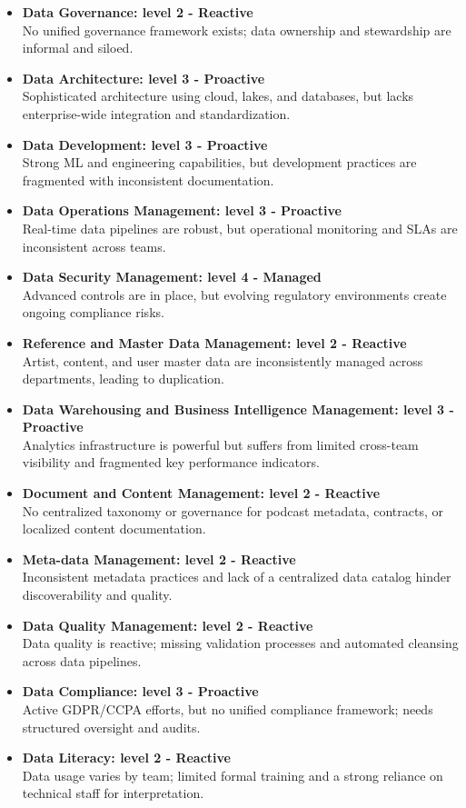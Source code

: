\documentclass[11pt,a4paper,computermodern]{article}
\begin{document}
\begin{itemize}
	\item \textbf{Data Governance: level 2 - Reactive}\\
	No unified governance framework exists; data ownership and stewardship are informal and siloed.
	\item \textbf{Data Architecture: level 3 - Proactive}\\
	Sophisticated architecture using cloud, lakes, and databases, but lacks enterprise-wide integration and standardization.
	\item \textbf{Data Development: level 3 - Proactive}\\
	Strong ML and engineering capabilities, but development practices are fragmented with inconsistent documentation.
	\item \textbf{Data Operations Management: level 3 - Proactive}\\
	Real-time data pipelines are robust, but operational monitoring and SLAs are inconsistent across teams.
	\item \textbf{Data Security Management: level 4 - Managed}\\
	Advanced controls are in place, but evolving regulatory environments create ongoing compliance risks.
	\item \textbf{Reference and Master Data Management: level 2 - Reactive}\\
	Artist, content, and user master data are inconsistently managed across departments, leading to duplication.
	\item \textbf{Data Warehousing and Business Intelligence Management: level 3 - Proactive}\\
	Analytics infrastructure is powerful but suffers from limited cross-team visibility and fragmented key performance indicators.
	\item \textbf{Document and Content Management: level 2 - Reactive}\\
	No centralized taxonomy or governance for podcast metadata, contracts, or localized content documentation.
	\item \textbf{Meta-data Management: level 2 - Reactive}\\
	Inconsistent metadata practices and lack of a centralized data catalog hinder discoverability and quality.
	\item \textbf{Data Quality Management: level 2 - Reactive}\\
	Data quality is reactive; missing validation processes and automated cleansing across data pipelines.
	\item \textbf{Data Compliance: level 3 - Proactive}\\
	Active GDPR/CCPA efforts, but no unified compliance framework; needs structured oversight and audits.
	\item \textbf{Data Literacy: level 2 - Reactive}\\
	Data usage varies by team; limited formal training and a strong reliance on technical staff for interpretation.
\end{itemize}
\end{document}

